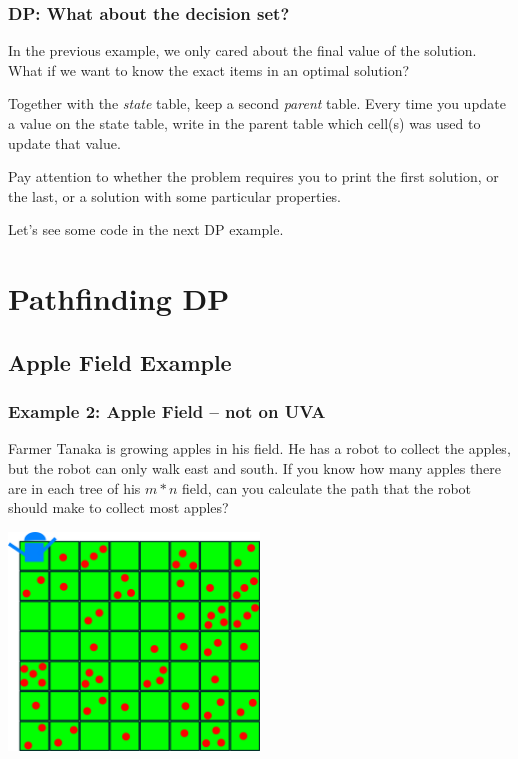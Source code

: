 \documentclass{beamer}
\begin{document}
\begin{frame}
  \frametitle{DP: What about the decision set?}  

  \begin{block}{}
  In the previous example, we only cared about the final value of the
  solution. What if we want to know the exact items in an optimal
  solution?
  \end{block}

  \medskip
  
  Together with the \emph{state} table, keep a second \emph{parent} table. 
  Every time you update a value on the state table, write in the parent table 
  which cell(s) was used to update that value.

  \medskip

  Pay attention to whether the problem requires you to print the first
  solution, or the last, or a solution with some particular
  properties.

  \bigskip

  Let's see some code in the next DP example.
\end{frame}



\section{Pathfinding DP}
\subsection{Apple Field Example}
\begin{frame}
  \frametitle{Example 2: Apple Field -- not on UVA}

  \begin{block}{}
  {\smaller
  Farmer Tanaka is growing apples in his field. He has a robot to collect the apples, but 
  the robot can only walk east and south. If you know how many apples there are in each 
  tree of his $m * n$ field, can you calculate the path that the robot should make to collect
  most apples?}
  \end{block}
  
  \begin{center}  
    \includegraphics[width=0.5\textwidth]{../img/applefield}
  \end{center}
\end{frame}
\end{document}
